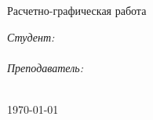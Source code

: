\documentclass[
12pt, %
oneside, %
english, %
singlespacing, %
headsepline, %
]{LabWhitepaper} %
\numberwithin{equation}{section}
\numberwithin{figure}{section}
\begin{document}
\begin{titlepage}
\begin{center}
\begin{figure}[h]
		\end{figure}
		\vspace{2cm}
		{\Large Расчетно-графическая работа\par} %
		\vspace{0.5cm}
		{\huge \bfseries \ttitle\par}
		\vspace{4cm} %
		\begin{minipage}[t]{1\textwidth}
			\begin{flushright} \large
				\emph{Студент:}\\
				{\studentname} \\%
				\emph{Преподаватель:} \\
				{\examname}
			\end{flushright}
		\end{minipage}\\
		\vfill
		{\large \today}%
	\end{center}
\end{titlepage}



\end{document}
